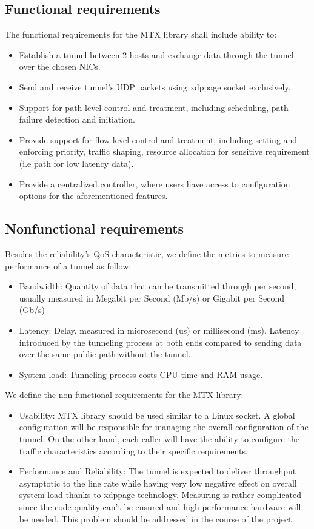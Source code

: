 \subsection{Functional requirements}
The functional requirements for the \ac{MTX} library shall include ability to:
\begin{itemize}
    \item Establish a tunnel between 2 hosts and exchange data through the tunnel over the chosen \ac{NIC}s.
    \item Send and receive tunnel's UDP packets using \ac{xdppage} socket exclusively.
    \item Support for path-level control and treatment, including scheduling, path failure detection and initiation. 
    \item Provide support for flow-level control and treatment, including setting and enforcing priority, traffic shaping, resource allocation for sensitive requirement (i.e path for low latency data).
    \item Provide a centralized controller, where users have access to configuration options for the aforementioned features.
\end{itemize}

\subsection{Nonfunctional requirements}
Besides the reliability's \ac{QoS} characteristic, we define the metrics to measure performance of a tunnel as follow:
\begin{itemize}
    \item Bandwidth: Quantity of data that can be transmitted through per second, usually measured in Megabit per Second (Mb/s) or Gigabit  per Second (Gb/s)
    \item Latency: Delay, measured in microsecond (us) or millisecond (ms). Latency introduced by the tunneling process at both ends compared to sending data over the same public path without the tunnel.
    \item System load: Tunneling process costs CPU time and RAM usage.
\end{itemize}

We define the non-functional requirements for the \ac{MTX} library:
\begin{itemize}
    \item Usability: \ac{MTX} library should be used similar to a Linux socket. A global configuration will be responsible for managing the overall configuration of the tunnel. On the other hand, each caller will have the ability to configure the traffic characteristics according to their specific requirements.
    \item Performance and Reliability: The tunnel is expected to deliver throughput asymptotic to the line rate while having very low negative effect on overall system load thanks to \ac{xdppage} technology. Measuring is rather complicated since the code quality can't be ensured and high performance hardware will be needed. This problem should be addressed in the course of the project.
\end{itemize}

